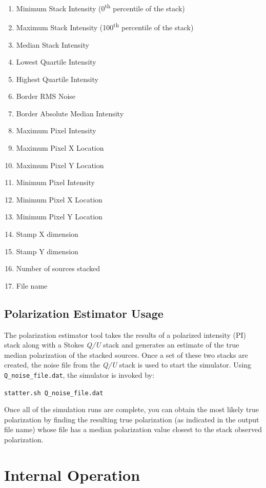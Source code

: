 \documentclass{article}
\begin{document}
\begin{enumerate}
	\item Minimum Stack Intensity (0\textsuperscript{th} percentile of the 
	stack)
	\item Maximum Stack Intensity (100\textsuperscript{th} percentile of the 
	stack)
	\item Median Stack Intensity
	\item Lowest Quartile Intensity
	\item Highest Quartile Intensity
	\item Border RMS Noise
	\item Border Absolute Median Intensity
	\item Maximum Pixel Intensity
	\item Maximum Pixel X Location
	\item Maximum Pixel Y Location
	\item Minimum Pixel Intensity
	\item Minimum Pixel X Location
	\item Minimum Pixel Y Location
	\item Stamp X dimension
	\item Stamp Y dimension
	\item Number of sources stacked
	\item File name
\end{enumerate}

\subsection{Polarization Estimator Usage}
The polarization estimator tool takes the results of a polarized intensity (PI)
stack along with a Stokes \emph{Q/U} stack and generates an estimate of the 
true median polarization of the stacked sources.  Once a set of these two 
stacks are created, the noise file from the \emph{Q/U} stack is used to start 
the simulator.  Using \verb!Q_noise_file.dat!, the simulator is invoked by:
\begin{center}
\verb!statter.sh Q_noise_file.dat!\\
\end{center}
\par
Once all of the simulation runs are complete, you can obtain the most likely 
true polarization by finding the resulting true polarization (as indicated
in the output file name) whose file has a median polarization value closest to 
the stack observed polarization.

\section{Internal Operation}
\end{document}
